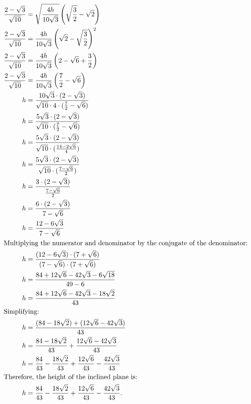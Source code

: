 \begin{solution}
\begin{align*}
        \frac{2-\sqrt{3}}{\sqrt{10}} &= \sqrt{\frac{4h}{10\sqrt{3}}} \left(\sqrt{\frac{3}{2}} - \sqrt{2}\right)\\
        \frac{2-\sqrt{3}}{\sqrt{10}} &= \frac{4h}{10\sqrt{3}} \left(\sqrt{2} - \sqrt{\frac{3}{2}}\right)^2\\
        \frac{2-\sqrt{3}}{\sqrt{10}} &= \frac{4h}{10\sqrt{3}} \left(2 - \sqrt{6} + \frac{3}{2}\right)\\
        \frac{2-\sqrt{3}}{\sqrt{10}} &= \frac{4h}{10\sqrt{3}} \left(\frac{7}{2} - \sqrt{6}\right)\\
        h &= \frac{10\sqrt{3} \cdot (2-\sqrt{3})}{\sqrt{10} \cdot 4 \cdot (\frac{7}{2} - \sqrt{6})}\\
        h &= \frac{5\sqrt{3} \cdot (2-\sqrt{3})}{\sqrt{10} \cdot (\frac{7}{2} - \sqrt{6})}\\
        h &= \frac{5\sqrt{3} \cdot (2-\sqrt{3})}{\sqrt{10} \cdot (\frac{14-2\sqrt{6}}{4})}\\
        h &= \frac{5\sqrt{3} \cdot (2-\sqrt{3})}{\sqrt{10} \cdot (\frac{7-\sqrt{6}}{2})}\\
        h &= \frac{3\cdot (2-\sqrt{3})}{\frac{7-\sqrt{6}}{2}}\\
        h &= \frac{6 \cdot (2-\sqrt{3})}{7-\sqrt{6}}\\
        h &= \frac{12 - 6\sqrt{3}}{7-\sqrt{6}}\\
        \intertext{Multiplying the numerator and denominator by the conjugate of the denominator:}
        h &= \frac{(12 - 6\sqrt{3}) \cdot (7+\sqrt{6})}{(7-\sqrt{6}) \cdot (7+\sqrt{6})}\\
        h &= \frac{84 + 12\sqrt{6} - 42\sqrt{3} - 6\sqrt{18}}{49 - 6}\\
        h &= \frac{84 + 12\sqrt{6} - 42\sqrt{3} - 18\sqrt{2}}{43}\\
        \intertext{Simplifying:}
        h &= \frac{(84 - 18\sqrt{2}) + (12\sqrt{6} - 42\sqrt{3})}{43}\\
        h &= \frac{84 - 18\sqrt{2}}{43} + \frac{12\sqrt{6} - 42\sqrt{3}}{43}\\
        h &= \frac{84}{43} - \frac{18\sqrt{2}}{43} + \frac{12\sqrt{6}}{43} - \frac{42\sqrt{3}}{43}\\
        \intertext{Therefore, the height of the inclined plane is:}
        h &= \frac{84}{43} - \frac{18\sqrt{2}}{43} + \frac{12\sqrt{6}}{43} - \frac{42\sqrt{3}}{43}.
    \end{align*}
\end{solution}